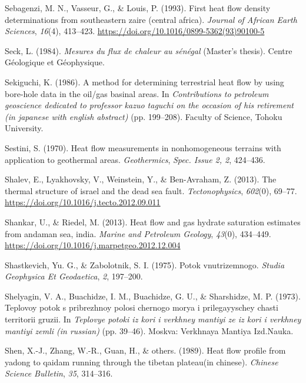 \documentclass[draft,linenumbers]{agujournal2018}
\begin{document}
\leavevmode{}%
Sebagenzi, M. N., Vasseur, G., \& Louis, P. (1993). First heat flow
density determinations from southeastern zaire (central africa).
\emph{Journal of African Earth Sciences}, \emph{16}(4), 413--423.
\url{https://doi.org/10.1016/0899-5362(93)90100-5}

\leavevmode{}%
Seck, L. (1984). \emph{Mesures du flux de chaleur au sénégal} (Master's
thesis). Centre Géologique et Géophysique.

\leavevmode{}%
Sekiguchi, K. (1986). A method for determining terrestrial heat flow by
using bore-hole data in the oil/gas basinal areas. In
\emph{Contributions to petroleum geoscience dedicated to professor kazuo
taguchi on the occasion of his retirement (in japanese with english
abstract)} (pp. 199--208). Faculty of Science, Tohoku University.

\leavevmode{}%
Sestini, S. (1970). Heat flow measurements in nonhomogeneous terrains
with application to geothermal areas. \emph{Geothermics}, \emph{Spec.
Issue 2, 2}, 424--436.

\leavevmode{}%
Shalev, E., Lyakhovsky, V., Weinstein, Y., \& Ben-Avraham, Z. (2013).
The thermal structure of israel and the dead sea fault.
\emph{Tectonophysics}, \emph{602}(0), 69--77.
\url{https://doi.org/10.1016/j.tecto.2012.09.011}

\leavevmode{}%
Shankar, U., \& Riedel, M. (2013). Heat flow and gas hydrate saturation
estimates from andaman sea, india. \emph{Marine and Petroleum Geology},
\emph{43}(0), 434--449.
\url{https://doi.org/10.1016/j.marpetgeo.2012.12.004}

\leavevmode{}%
Shastkevich, Yu. G., \& Zabolotnik, S. I. (1975). Potok vnutrizemnogo.
\emph{Studia Geophysica Et Geodaetica}, \emph{2}, 197--200.

\leavevmode{}%
Shelyagin, V. A., Buachidze, I. M., Buachidze, G. U., \& Sharshidze, M.
P. (1973). Teplovoy potok s pribrezhnoy polosi chernogo morya i
prilegayyschey chasti territorii gruzii. In \emph{Teplovye potoki iz
kori i verkhney mantiyi ze iz kori i verkhney mantiyi zemli (in
russian)} (pp. 39--46). Moskva: Verkhnaya Mantiya Izd.Nauka.

\leavevmode{}%
Shen, X.-J., Zhang, W.-R., Guan, H., \& others. (1989). Heat flow
profile from yadong to qaidam running through the tibetan plateau(in
chinese). \emph{Chinese Science Bulletin}, \emph{35}, 314--316.
\end{document}
